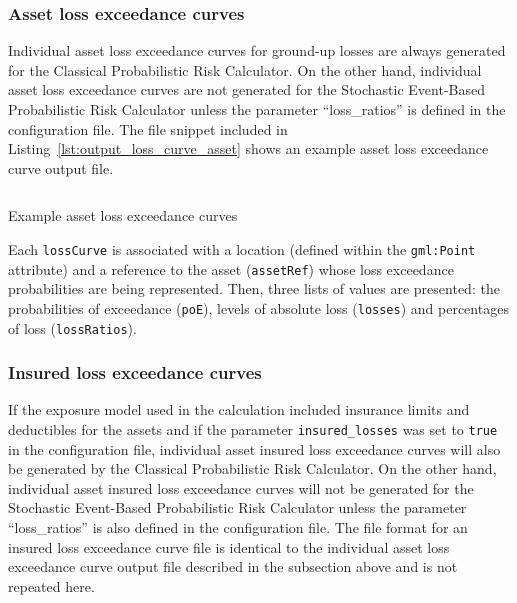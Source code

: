 \subsubsection{Asset loss exceedance curves}
\label{subsubsec:asset_loss_curves}

Individual asset loss exceedance curves for ground-up losses are always
generated for the Classical Probabilistic Risk Calculator. On the other hand,
individual asset loss exceedance curves are not generated for the Stochastic
Event-Based Probabilistic Risk Calculator unless the parameter
``loss\_ratios'' is defined in the configuration file. The file snippet
included in Listing~\ref{lst:output_loss_curve_asset} shows an example asset
loss exceedance curve output file.

\begin{listing}[htbp]
  \inputminted[firstline=1,firstnumber=1,fontsize=\footnotesize,frame=single,bgcolor=lightgray]{xml}{oqum/risk/verbatim/output_loss_curve_asset.xml}
  \caption{Example asset loss exceedance curves}
  \label{lst:output_loss_curve_asset}
\end{listing}

Each \Verb+lossCurve+ is associated with a location (defined within the
\Verb+gml:Point+ attribute) and a reference to the \gls{asset}
(\Verb+assetRef+) whose loss exceedance probabilities are being represented.
Then, three lists of values are presented: the probabilities of exceedance
(\Verb+poE+), levels of absolute loss (\Verb+losses+) and percentages of loss
(\Verb+lossRatios+).

\subsubsection{Insured loss exceedance curves}
\label{subsubsec:insured_loss_curves}

If the exposure model used in the calculation included insurance limits and
deductibles for the assets and if the parameter \Verb+insured_losses+ was set
to \Verb+true+ in the configuration file, individual asset insured loss
exceedance curves will also be generated by the Classical Probabilistic Risk
Calculator. On the other hand, individual asset insured loss exceedance curves
will not be generated for the Stochastic Event-Based Probabilistic Risk
Calculator unless the parameter ``loss\_ratios'' is also defined in the
configuration file. The file format for an insured loss exceedance curve file
is identical to the individual asset loss exceedance curve output file
described in the subsection above and is not repeated here.

